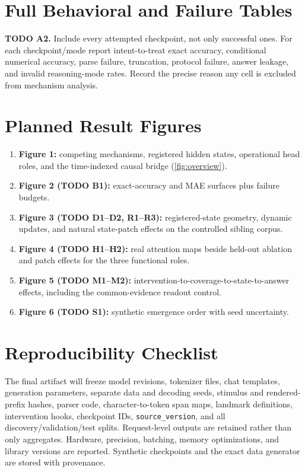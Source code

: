\documentclass[10pt,twocolumn]{article}
\newcommand{\todoid}[2]{%
  \par\noindent\textcolor{red!75!black}{\textbf{TODO #1.} #2}\par}
\begin{document}
\section{Full Behavioral and Failure Tables}
\todoid{A2}{Include every attempted checkpoint, not only successful ones. For each
checkpoint/mode report intent-to-treat exact accuracy, conditional numerical accuracy, parse
failure, truncation, protocol failure, answer leakage, and invalid reasoning-mode rates. Record
the precise reason any cell is excluded from mechanism analysis.}

\section{Planned Result Figures}
\begin{enumerate}
  \item \textbf{Figure 1:} competing mechanisms, registered hidden states, operational head
  roles, and the time-indexed causal bridge (\cref{fig:overview}).
  \item \textbf{Figure 2 (TODO B1):} exact-accuracy and MAE surfaces plus failure budgets.
  \item \textbf{Figure 3 (TODO D1--D2, R1--R3):} registered-state geometry, dynamic updates, and
  natural state-patch effects on the controlled sibling corpus.
  \item \textbf{Figure 4 (TODO H1--H2):} real attention maps beside held-out ablation and patch
  effects for the three functional roles.
  \item \textbf{Figure 5 (TODO M1--M2):} intervention-to-coverage-to-state-to-answer effects,
  including the common-evidence readout control.
  \item \textbf{Figure 6 (TODO S1):} synthetic emergence order with seed uncertainty.
\end{enumerate}

\section{Reproducibility Checklist}
The final artifact will freeze model revisions, tokenizer files, chat templates, generation
parameters, separate data and decoding seeds, stimulus and rendered-prefix hashes, parser code,
character-to-token span maps, landmark definitions, intervention hooks, checkpoint IDs,
\texttt{source\_version}, and all discovery/validation/test splits. Request-level outputs are
retained rather than only aggregates. Hardware, precision, batching, memory optimizations, and
library versions are reported. Synthetic checkpoints and the exact data generator are stored
with provenance.
\end{document}
